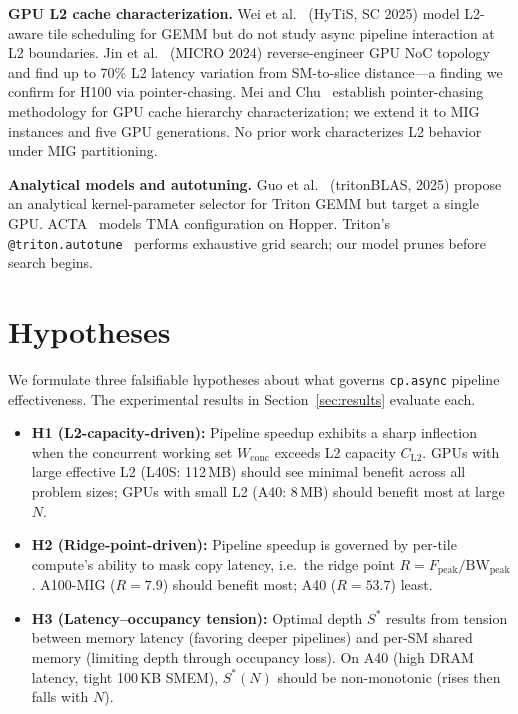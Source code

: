 \documentclass[sigplan,nonacm,10pt]{acmart}
\newcommand{\cpasync}{\texttt{cp.async}}
\begin{document}
\textbf{GPU L2 cache characterization.}
Wei et al.~\cite{hytis} (HyTiS, SC 2025) model L2-aware tile
scheduling for GEMM but do not study async pipeline interaction at L2
boundaries.
Jin et al.~\cite{gpu_noc} (MICRO 2024) reverse-engineer GPU NoC topology
and find up to 70\% L2 latency variation from SM-to-slice distance---a
finding we confirm for H100 via pointer-chasing.
Mei and Chu~\cite{mei_dissecting} establish pointer-chasing methodology
for GPU cache hierarchy characterization; we extend it to MIG instances
and five GPU generations.
No prior work characterizes L2 behavior under MIG partitioning.

\textbf{Analytical models and autotuning.}
Guo et al.~\cite{tritonblas} (tritonBLAS, 2025) propose an analytical
kernel-parameter selector for Triton GEMM but target a single GPU.
ACTA~\cite{acta} models TMA configuration on Hopper.
Triton's \texttt{@triton.autotune}~\cite{triton} performs exhaustive
grid search; our model prunes before search begins.

\section{Hypotheses}
\label{sec:hypotheses}

We formulate three falsifiable hypotheses about what governs
\cpasync{} pipeline effectiveness.
The experimental results in Section~\ref{sec:results} evaluate each.

\begin{itemize}
\item \textbf{H1 (L2-capacity-driven):}
  Pipeline speedup exhibits a sharp inflection when the concurrent
  working set $W_{\text{conc}}$ exceeds L2 capacity $C_{\text{L2}}$.
  GPUs with large effective L2 (L40S: 112\,MB) should see minimal
  benefit across all problem sizes; GPUs with small L2 (A40: 8\,MB)
  should benefit most at large $N$.

\item \textbf{H2 (Ridge-point-driven):}
  Pipeline speedup is governed by per-tile compute's ability to mask
  copy latency, i.e.\ the ridge point
  $R = F_{\text{peak}}/\text{BW}_{\text{peak}}$.
  A100-MIG ($R = 7.9$) should benefit most; A40 ($R = 53.7$) least.

\item \textbf{H3 (Latency--occupancy tension):}
  Optimal depth $S^*$ results from tension between memory latency
  (favoring deeper pipelines) and per-SM shared memory (limiting depth
  through occupancy loss).
  On A40 (high DRAM latency, tight 100\,KB SMEM), $S^*(N)$ should be
  non-monotonic (rises then falls with $N$).
\end{itemize}
\end{document}

